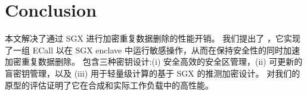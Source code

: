\section{Conclusion}

本文解决了通过 SGX 进行加密重复数据删除的性能开销。 我们提出了 \sysnameS，它实现了一组 ECall 以在 SGX enclave 中运行敏感操作，从而在保持安全性的同时加速加密重复数据删除。 \sysnameS 包含三种密钥设计:(i) 安全高效的安全区管理，(ii) 可更新的盲密钥管理，以及 (iii) 用于轻量级计算的基于 SGX 的推测加密设计。 对我们的 \sysnameS 原型的评估证明了它在合成和实际工作负载中的高性能。
